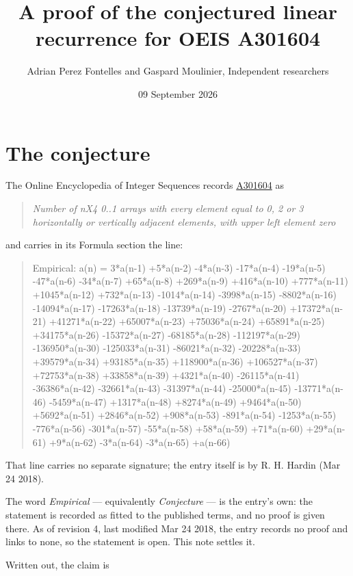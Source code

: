 \documentclass[11pt]{article}
\title{A proof of the conjectured linear recurrence for OEIS A301604}
\author{Adrian Perez Fontelles and Gaspard Moulinier, Independent researchers}
\date{09 September 2026}
\theoremstyle{definition}
\begin{document}
\maketitle
\section{The conjecture}

The Online Encyclopedia of Integer Sequences records \href{https://oeis.org/A301604}{A301604} as

\begin{quote}\itshape Number of nX4 0..1 arrays with every element equal to 0, 2 or 3 horizontally or vertically adjacent elements, with upper left element zero\end{quote}

and carries in its Formula section the line:

\begin{quote}\ttfamily Empirical: a(n) = 3*a(n-1) +5*a(n-2) -4*a(n-3) -17*a(n-4) -19*a(n-5) -47*a(n-6) -34*a(n-7) +65*a(n-8) +269*a(n-9) +416*a(n-10) +777*a(n-11) +1045*a(n-12) +732*a(n-13) -1014*a(n-14) -3998*a(n-15) -8802*a(n-16) -14094*a(n-17) -17263*a(n-18) -13739*a(n-19) -2767*a(n-20) +17372*a(n-21) +41271*a(n-22) +65007*a(n-23) +75036*a(n-24) +65891*a(n-25) +34175*a(n-26) -15372*a(n-27) -68185*a(n-28) -112197*a(n-29) -136950*a(n-30) -125033*a(n-31) -86021*a(n-32) -20228*a(n-33) +39579*a(n-34) +93185*a(n-35) +118900*a(n-36) +106527*a(n-37) +72753*a(n-38) +33858*a(n-39) +4321*a(n-40) -26115*a(n-41) -36386*a(n-42) -32661*a(n-43) -31397*a(n-44) -25000*a(n-45) -13771*a(n-46) -5459*a(n-47) +1317*a(n-48) +8274*a(n-49) +9464*a(n-50) +5692*a(n-51) +2846*a(n-52) +908*a(n-53) -891*a(n-54) -1253*a(n-55) -776*a(n-56) -301*a(n-57) -55*a(n-58) +58*a(n-59) +71*a(n-60) +29*a(n-61) +9*a(n-62) -3*a(n-64) -3*a(n-65) +a(n-66)\end{quote}

That line carries no separate signature; the entry itself is by R. H. Hardin (Mar 24 2018).

The word {\itshape Empirical} --- equivalently {\itshape Conjecture} --- is the entry's own: the statement is recorded as fitted to the published terms, and no proof is given there. As of revision 4, last modified Mar 24 2018, the entry records no proof and links to none, so the statement is open. This note settles it.

Written out, the claim is
\end{document}

